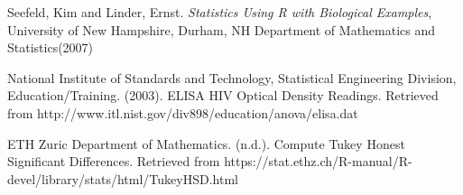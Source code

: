 \documentclass[11pt]{article}
\begin{document}
\begin{thebibliography}{99}

Seefeld, Kim and Linder, Ernst. \emph{Statistics Using R
with Biological Examples}, University of New Hampshire, Durham, NH
Department of Mathematics and Statistics(2007)

National Institute of Standards and Technology, Statistical Engineering Division, Education/Training. (2003). ELISA HIV Optical Density Readings. Retrieved from http://www.itl.nist.gov/div898/education/anova/elisa.dat

ETH Zuric Department of Mathematics. (n.d.). Compute Tukey Honest Significant Differences. Retrieved from https://stat.ethz.ch/R-manual/R-devel/library/stats/html/TukeyHSD.html

 
\end{thebibliography}

\printnomenclature
\end{document}
